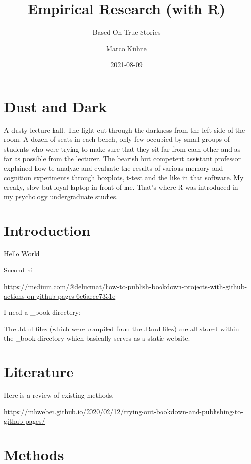 \documentclass[
]{book}
\title{Empirical Research (with R)}
\subtitle{Based On True Stories}
\author{Marco Kühne}
\date{2021-08-09}
\begin{document}
\maketitle

{
\setcounter{tocdepth}{1}
\tableofcontents
}
\hypertarget{dust-and-dark}{%
\chapter*{Dust and Dark}\label{dust-and-dark}}

A dusty lecture hall. The light cut through the darkness from the left side of the room. A dozen of seats in each bench, only few occupied by small groups of students who were trying to make sure that they sit far from each other and as far as possible from the lecturer. The bearish but competent assistant professor explained how to analyze and evaluate the results of various memory and cognition experiments through boxplots, t-test and the like in that software. My creaky, slow but loyal laptop in front of me. That's where R was introduced in my psychology undergraduate studies.

\hypertarget{introduction}{%
\chapter{Introduction}\label{introduction}}

Hello World

Second hi

\url{https://medium.com/@delucmat/how-to-publish-bookdown-projects-with-github-actions-on-github-pages-6e6aecc7331e}

I need a \_book directory:

The .html files (which were compiled from the .Rmd files) are all stored within the \_book directory which basically serves as a static website.

\hypertarget{literature}{%
\chapter{Literature}\label{literature}}

Here is a review of existing methods.

\url{https://mhweber.github.io/2020/02/12/trying-out-bookdown-and-publishing-to-github-pages/}

\hypertarget{methods}{%
\chapter{Methods}\label{methods}}
\end{document}
